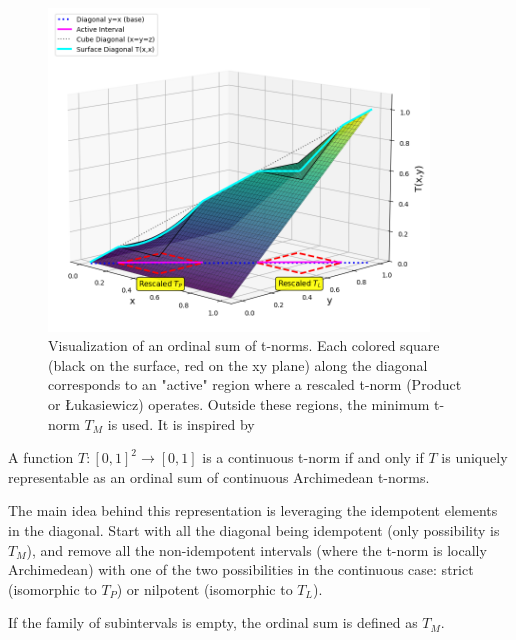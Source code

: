 \begin{figure}[!ht]
    \centering
    \includegraphics[width=0.9\textwidth]{ch1/figures/ordinal_sums.png}
    \caption{Visualization of an ordinal sum of t-norms. Each colored square (black on the surface, red on the xy plane) along the diagonal corresponds to an "active" region where a rescaled t-norm (Product or Łukasiewicz) operates. Outside these regions, the minimum t-norm $T_M$ is used. It is inspired by \cite[Fig.~3.16]{Klement2000}}
    \label{fig:ordinal_sum_tnorm}
\end{figure}



\begin{theorem}
  A function $T: [0,1]^2 \to [0,1]$ is a continuous t-norm if and only if $T$ is uniquely representable as an ordinal sum of continuous Archimedean t-norms.
\end{theorem}

The main idea behind this representation is leveraging the idempotent elements in the diagonal. Start with all the diagonal being idempotent (only possibility is $T_M$), and remove all the non-idempotent intervals (where the t-norm is locally Archimedean) with one of the two possibilities in the continuous case: strict (isomorphic to $T_P$) or nilpotent (isomorphic to $T_L$).

\begin{remark}
  If the family of subintervals is empty, the ordinal sum is defined as $T_M$.
\end{remark}

